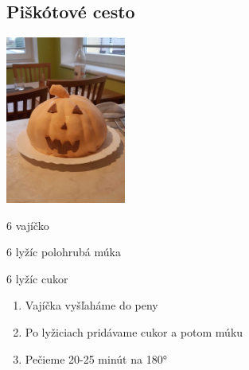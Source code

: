 \setcounter{step}{0}
\subsection{Piškótové cesto}

\begin{ingredient}
\includegraphics[height=5.5cm]{images/pistkot_krem_salko}
\def\portions{8}%

\begin{main}
	\item 6 vajíčko
	\item 6 lyžíc polohrubá múka
	\item 6 lyžíc cukor
\end{main}
\end{ingredient}
\begin{recipe}

\begin{enumerate}
\item{Vajíčka vyšľaháme do peny}
\item{Po lyžiciach pridávame cukor a potom múku}
\item{Pečieme 20-25 minút na 180°}
\end{enumerate}
\end{recipe}

\begin{notes}

\end{notes}
\clearpage	